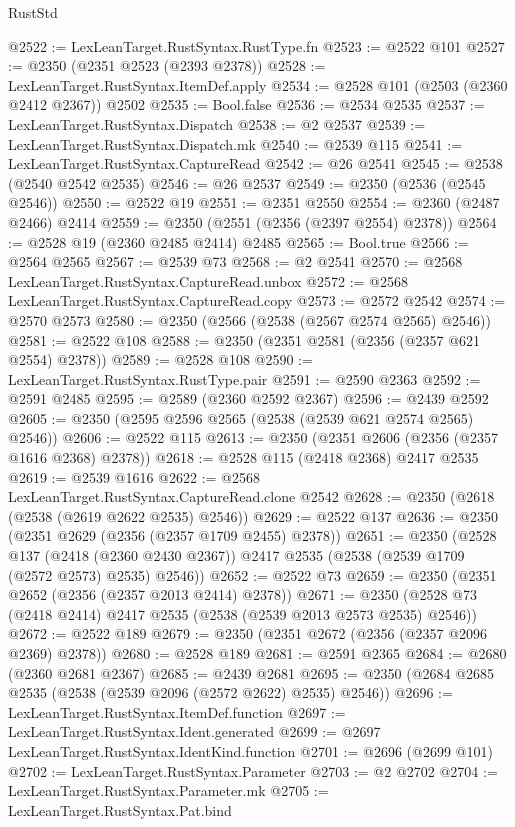 \begin{lexlean}{RustStd}
\begin{coremodule}
@2522 := LexLeanTarget.RustSyntax.RustType.fn
@2523 := @2522 @101
@2527 := @2350 (@2351 @2523 (@2393 @2378))
@2528 := LexLeanTarget.RustSyntax.ItemDef.apply
@2534 := @2528 @101 (@2503 (@2360 @2412 @2367)) @2502
@2535 := Bool.false
@2536 := @2534 @2535
@2537 := LexLeanTarget.RustSyntax.Dispatch
@2538 := @2 @2537
@2539 := LexLeanTarget.RustSyntax.Dispatch.mk
@2540 := @2539 @115
@2541 := LexLeanTarget.RustSyntax.CaptureRead
@2542 := @26 @2541
@2545 := @2538 (@2540 @2542 @2535)
@2546 := @26 @2537
@2549 := @2350 (@2536 (@2545 @2546))
@2550 := @2522 @19
@2551 := @2351 @2550
@2554 := @2360 (@2487 @2466) @2414
@2559 := @2350 (@2551 (@2356 (@2397 @2554) @2378))
@2564 := @2528 @19 (@2360 @2485 @2414) @2485
@2565 := Bool.true
@2566 := @2564 @2565
@2567 := @2539 @73
@2568 := @2 @2541
@2570 := @2568 LexLeanTarget.RustSyntax.CaptureRead.unbox
@2572 := @2568 LexLeanTarget.RustSyntax.CaptureRead.copy
@2573 := @2572 @2542
@2574 := @2570 @2573
@2580 := @2350 (@2566 (@2538 (@2567 @2574 @2565) @2546))
@2581 := @2522 @108
@2588 := @2350 (@2351 @2581 (@2356 (@2357 @621 @2554) @2378))
@2589 := @2528 @108
@2590 := LexLeanTarget.RustSyntax.RustType.pair
@2591 := @2590 @2363
@2592 := @2591 @2485
@2595 := @2589 (@2360 @2592 @2367)
@2596 := @2439 @2592
@2605 := @2350 (@2595 @2596 @2565 (@2538 (@2539 @621 @2574 @2565) @2546))
@2606 := @2522 @115
@2613 := @2350 (@2351 @2606 (@2356 (@2357 @1616 @2368) @2378))
@2618 := @2528 @115 (@2418 @2368) @2417 @2535
@2619 := @2539 @1616
@2622 := @2568 LexLeanTarget.RustSyntax.CaptureRead.clone @2542
@2628 := @2350 (@2618 (@2538 (@2619 @2622 @2535) @2546))
@2629 := @2522 @137
@2636 := @2350 (@2351 @2629 (@2356 (@2357 @1709 @2455) @2378))
@2651 := @2350
    (@2528
      @137
      (@2418 (@2360 @2430 @2367))
      @2417
      @2535
      (@2538 (@2539 @1709 (@2572 @2573) @2535) @2546))
@2652 := @2522 @73
@2659 := @2350 (@2351 @2652 (@2356 (@2357 @2013 @2414) @2378))
@2671 := @2350 (@2528 @73 (@2418 @2414) @2417 @2535 (@2538 (@2539 @2013 @2573 @2535) @2546))
@2672 := @2522 @189
@2679 := @2350 (@2351 @2672 (@2356 (@2357 @2096 @2369) @2378))
@2680 := @2528 @189
@2681 := @2591 @2365
@2684 := @2680 (@2360 @2681 @2367)
@2685 := @2439 @2681
@2695 := @2350 (@2684 @2685 @2535 (@2538 (@2539 @2096 (@2572 @2622) @2535) @2546))
@2696 := LexLeanTarget.RustSyntax.ItemDef.function
@2697 := LexLeanTarget.RustSyntax.Ident.generated
@2699 := @2697 LexLeanTarget.RustSyntax.IdentKind.function
@2701 := @2696 (@2699 @101)
@2702 := LexLeanTarget.RustSyntax.Parameter
@2703 := @2 @2702
@2704 := LexLeanTarget.RustSyntax.Parameter.mk
@2705 := LexLeanTarget.RustSyntax.Pat.bind

\end{coremodule}
\end{lexlean}
